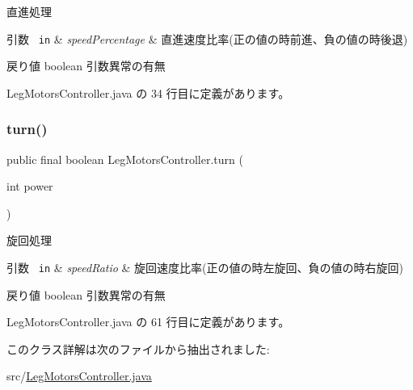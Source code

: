直進処理 


\begin{DoxyParams}[1]{引数}
\mbox{\texttt{ in}}  & {\em speed\+Percentage} & 直進速度比率(正の値の時前進、負の値の時後退) \\
\hline
\end{DoxyParams}
\begin{DoxyReturn}{戻り値}
boolean 引数異常の有無 
\end{DoxyReturn}


 Leg\+Motors\+Controller.\+java の 34 行目に定義があります。

\mbox{\label{class_leg_motors_controller_a0df4b63d6a21857d8b5fbff3875ff962}} 
\subsubsection{\texorpdfstring{turn()}{turn()}}
{\footnotesize\ttfamily public final boolean Leg\+Motors\+Controller.\+turn (\begin{DoxyParamCaption}\item[{int}]{power }\end{DoxyParamCaption})\hspace{0.3cm}{\ttfamily [inline]}}



旋回処理 


\begin{DoxyParams}[1]{引数}
\mbox{\texttt{ in}}  & {\em speed\+Ratio} & 旋回速度比率(正の値の時左旋回、負の値の時右旋回) \\
\hline
\end{DoxyParams}
\begin{DoxyReturn}{戻り値}
boolean 引数異常の有無 
\end{DoxyReturn}


 Leg\+Motors\+Controller.\+java の 61 行目に定義があります。



このクラス詳解は次のファイルから抽出されました\+:\begin{DoxyCompactItemize}
\item 
src/\mbox{\hyperlink{_leg_motors_controller_8java}{Leg\+Motors\+Controller.\+java}}\end{DoxyCompactItemize}
